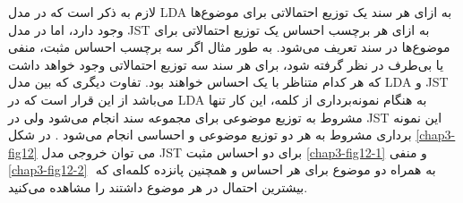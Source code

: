      لازم به ذکر است که در مدل 
     LDA
به ازای هر سند یک توزیع احتمالاتی برای موضوع‌ها وجود دارد، اما در مدل 
     JST
     به ازای هر برچسب احساس یک توزیع احتمالاتی برای موضوع‌ها در سند تعریف می‌شود. به طور مثال اگر سه‌ برچسب احساس مثبت، منفی‌ یا بی‌طرف در نظر گرفته شود، برای هر سند سه‌ توزیع احتمالاتی وجود خواهد داشت که هر کدام متناظر با یک احساس خواهند بود. تفاوت دیگری که بین مدل
LDA
       و
JST
می‌باشد از این قرار است که در
LDA
  به هنگام نمونه‌برداری از کلمه، این کار تنها مشروط به توزیع موضوعی برای مجموعه سند انجام می‌‌شود ولی‌ در
JST
    این نمونه برداری مشروط به هر دو توزیع موضوعی و احساسی‌ انجام می‌‌شود
    \cite{lin2012weakly}.
    در شکل
    \ref{chap3-fig12}
    می‌ توان خروجی مدل
    JST
    برای دو احساس مثبت 
    \ref{chap3-fig12-1}
    و منفی
    \ref{chap3-fig12-2}
    ‌  به همراه دو موضوع برای هر احساس و همچنین پانزده کلمه‌ای که بیشترین احتمال در هر موضوع داشتند را مشاهده می‌‌کنید.
    
